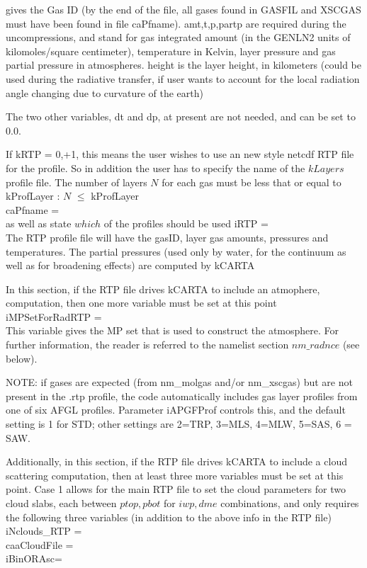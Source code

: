 \documentclass[12pt]{article}
\newcommand{\kc}{\textsf{kCARTA}\xspace}
\newcommand{\ttab}{\indent\indent}
\begin{document}
{\medskip
{} gives the Gas ID (by the end of the file, all
gases found in GASFIL and XSCGAS must have been found in file
caPfname).  {\sf amt,t,p,partp} are required during the
uncompressions, and stand for gas integrated amount (in the {\sf
GENLN2} units of kilomoles/square centimeter), temperature in
Kelvin, layer pressure and gas partial pressure in atmospheres.
{\sf height} is the layer height, in kilometers (could be used
during the radiative transfer, if user wants to account for the
local radiation angle changing due to curvature of the earth)

The two other variables, {\sf dt} and {\sf dp}, at present are not
needed, and can be set to 0.0.

If kRTP = 0,+1, this means the user wishes to use an new style netcdf RTP
file for the profile. So in addition the user has to specify the name 
of the $kLayers$ profile file. The number of layers $N$ for each gas must
be less that or equal to kProfLayer : $N$ $\le$ kProfLayer\\
{\sf 
\ttab caPfname = \\
}
as well as state $which$ of the profiles should be used
{\sf 
\ttab iRTP = \\
}
The RTP profile file will have the gasID, layer gas amounts, pressures and
temperatures. The partial pressures (used only by water, for the continuum as
well as for broadening effects) are computed by \kc

In this section, if the RTP file drives \kc to include an atmophere, 
computation, then one more variable must be set at this point \\
{\sf 
\ttab iMPSetForRadRTP = \\
}
This variable gives the MP set that is used to construct the atmosphere. For 
further information, the reader is referred to the namelist section 
$nm\_radnce$  (see below).

NOTE: if gases are expected (from nm\_molgas and/or nm\_xscgas) but are not present
in the .rtp profile, the code automatically includes gas layer profiles from 
one of six AFGL profiles. Parameter iAPGFProf controls this, and the default
setting is 1 for STD; other settings are 2=TRP, 3=MLS, 4=MLW, 5=SAS, 6 = SAW.

Additionally, in this section, if the RTP file drives \kc to include a cloud 
scattering computation, then at least three more variables must be set at this
point. Case 1 allows for the main RTP file to set the cloud parameters for two
cloud slabs, each between $ptop,pbot$ for $iwp,dme$ combinations, and only
requires the following three variables (in addition to the above info in the
RTP file) \\
{\sf 
\ttab iNclouds\_RTP = \\
\ttab caaCloudFile = \\
\ttab iBinORAsc= \\
}

}
\end{document}
